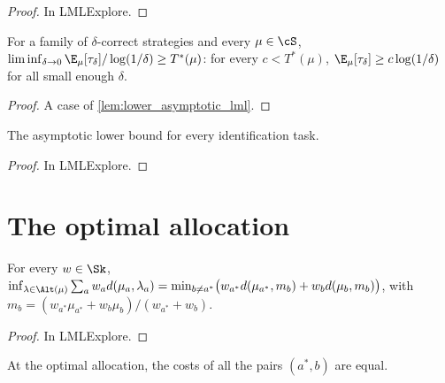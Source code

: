 \begin{proof}
  \leanok
  In LMLExplore.
\end{proof}

\begin{corollary}[{\cite[Remark 2]{GK16}}]
  \label{rem:lower_asymptotic}
  \leanok
  For a family of $\delta$-correct strategies and every $\mu \in \cS$,
  $\liminf_{\delta \to 0} \E_\mu[\tau_\delta] / \log(1/\delta) \ge T^*(\mu)$: for every
  $c < T^*(\mu)$, $\E_\mu[\tau_\delta] \ge c \log(1/\delta)$ for all small enough $\delta$.
\end{corollary}

\begin{proof}
  \leanok
  A case of \cref{lem:lower_asymptotic_lml}.
\end{proof}

\begin{lemma}
  \label{lem:lower_asymptotic_lml}
  \leanok
  The asymptotic lower bound for every identification task.
\end{lemma}

\begin{proof}
  \leanok
  In LMLExplore.
\end{proof}

\chapter{The optimal allocation}
\label{chap:optalloc}

\begin{lemma}[{\cite[Lemma 3]{GK16}}]
  \label{lem:pair_cost}
  \leanok
  For every $w \in \Sk$,
  $\inf_{\lambda \in \Alt(\mu)} \sum_a w_a d(\mu_a, \lambda_a)
  = \min_{b \ne a^*} \bigl( w_{a^*} d(\mu_{a^*}, m_b) + w_b d(\mu_b, m_b) \bigr)$, with
  $m_b = (w_{a^*}\mu_{a^*} + w_b\mu_b) / (w_{a^*} + w_b)$.
\end{lemma}

\begin{proof}
  \leanok
  In LMLExplore.
\end{proof}

\begin{lemma}[{\cite[Lemma 4]{GK16}}]
  \label{lem:equalize}
  \leanok
  At the optimal allocation, the costs of all the pairs $(a^*, b)$ are equal.
\end{lemma}

